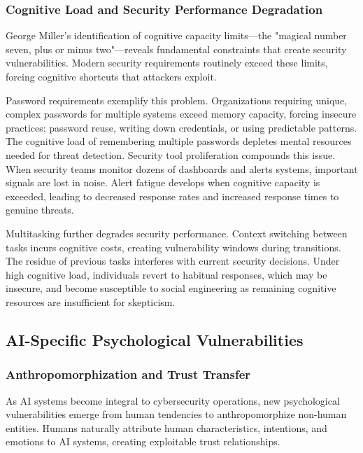 \documentclass[manuscript,screen,review]{acmart}
\begin{document}
\subsubsection{Cognitive Load and Security Performance Degradation}

George Miller's identification of cognitive capacity limits\cite{miller1956}—the "magical number seven, plus or minus two"—reveals fundamental constraints that create security vulnerabilities. Modern security requirements routinely exceed these limits, forcing cognitive shortcuts that attackers exploit.

Password requirements exemplify this problem. Organizations requiring unique, complex passwords for multiple systems exceed memory capacity, forcing insecure practices: password reuse, writing down credentials, or using predictable patterns. The cognitive load of remembering multiple passwords depletes mental resources needed for threat detection. Security tool proliferation compounds this issue. When security teams monitor dozens of dashboards and alerts systems, important signals are lost in noise. Alert fatigue develops when cognitive capacity is exceeded, leading to decreased response rates and increased response times to genuine threats.

Multitasking further degrades security performance. Context switching between tasks incurs cognitive costs, creating vulnerability windows during transitions. The residue of previous tasks interferes with current security decisions. Under high cognitive load, individuals revert to habitual responses, which may be insecure, and become susceptible to social engineering as remaining cognitive resources are insufficient for skepticism.

\subsection{AI-Specific Psychological Vulnerabilities}

\subsubsection{Anthropomorphization and Trust Transfer}

As AI systems become integral to cybersecurity operations, new psychological vulnerabilities emerge from human tendencies to anthropomorphize non-human entities. Humans naturally attribute human characteristics, intentions, and emotions to AI systems, creating exploitable trust relationships.
\end{document}
